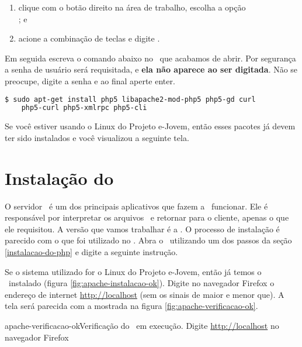 \begin{enumerate}
	\item clique com o botão direito na área de trabalho, escolha a opção \\
	; e
	\item acione a combinação de teclas \altfdois e digite \xfceterminal.
\end{enumerate}

Em seguida escreva o comando abaixo no \terminal~que acabamos de abrir. Por segurança
a senha de usuário será requisitada, e \textbf{ela não aparece ao ser digitada}.
Não se preocupe, digite a senha e ao final aperte enter. 

\begin{lstlisting}[language=bash,style=codigos]
  $ sudo apt-get install php5 libapache2-mod-php5 php5-gd curl 
  	php5-curl php5-xmlrpc php5-cli
\end{lstlisting}

Se você estiver usando o Linux do Projeto e-Jovem, então esses pacotes já devem
ter sido instalados e você visualizou a seguinte tela.


\section{Instalação do \apache}
\label{instalacao-do-apache}

O servidor \apache~é um dos principais aplicativos que fazem a \web~funcionar.
Ele é responsável por interpretar os arquivos \phpextensao~e retornar para o
cliente, apenas o que ele requisitou. A versão que vamos trabalhar é a \apacheversao.
O processo de instalação é parecido com o que foi utilizado no \php. Abra o
\terminal~utilizando um dos passos da seção \ref{instalacao-do-php} e digite a 
seguinte instrução.



Se o sistema utilizado for o Linux do Projeto e-Jovem, então já temos o \apache
\apacheversao~instalado (figura \ref{fig:apache-instalacao-ok}). Digite no navegador 
Firefox o endereço de internet \url{http://localhost} (sem os sinais de maior e menor que). 
A tela será parecida com a mostrada na figura \ref{fig:apache-verificacao-ok}.

			{apache-verificacao-ok}{Verificação do \apache~em execução. Digite \url{http://localhost} no navegador Firefox}

